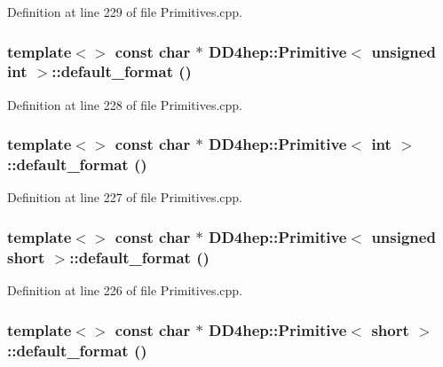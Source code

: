 Definition at line 229 of file Primitives.cpp.\hypertarget{struct_d_d4hep_1_1_primitive_a737b938859099ac8ee5c644481f99120}{
\subsubsection[{default\_\-format}]{\setlength{\rightskip}{0pt plus 5cm}template$<$$>$ const char $\ast$ {\bf DD4hep::Primitive}$<$ unsigned int $>$::default\_\-format ()}}
\label{struct_d_d4hep_1_1_primitive_a737b938859099ac8ee5c644481f99120}


Definition at line 228 of file Primitives.cpp.\hypertarget{struct_d_d4hep_1_1_primitive_a8274c3e042d1ebcae041780ef4237f75}{
\subsubsection[{default\_\-format}]{\setlength{\rightskip}{0pt plus 5cm}template$<$$>$ const char $\ast$ {\bf DD4hep::Primitive}$<$ int $>$::default\_\-format ()}}
\label{struct_d_d4hep_1_1_primitive_a8274c3e042d1ebcae041780ef4237f75}


Definition at line 227 of file Primitives.cpp.\hypertarget{struct_d_d4hep_1_1_primitive_a39e4c6eb8b74e74fed0764e9bb6fef0d}{
\subsubsection[{default\_\-format}]{\setlength{\rightskip}{0pt plus 5cm}template$<$$>$ const char $\ast$ {\bf DD4hep::Primitive}$<$ unsigned short $>$::default\_\-format ()}}
\label{struct_d_d4hep_1_1_primitive_a39e4c6eb8b74e74fed0764e9bb6fef0d}


Definition at line 226 of file Primitives.cpp.\hypertarget{struct_d_d4hep_1_1_primitive_a60d74c3b3478378f03ef5d6f86396649}{
\subsubsection[{default\_\-format}]{\setlength{\rightskip}{0pt plus 5cm}template$<$$>$ const char $\ast$ {\bf DD4hep::Primitive}$<$ short $>$::default\_\-format ()}}
\label{struct_d_d4hep_1_1_primitive_a60d74c3b3478378f03ef5d6f86396649}


